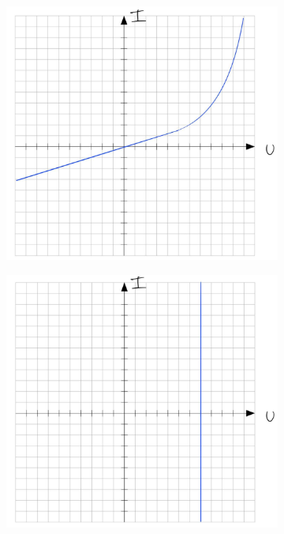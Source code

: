 \begin{figure}[H]
\begin{subfigure}[b]{0.45\textwidth}
        \caption{}
        \label{fig:VA_C_c}
    \end{subfigure}
    \hfill
    \begin{subfigure}[b]{0.45\textwidth}
        \includegraphics[width=\textwidth]{Voraufgaben/Cd.jpg}
        \caption{}
        \label{fig:VA_C_d}
    \end{subfigure}
    \vspace{0.5em}
    \begin{subfigure}[b]{0.45\textwidth}
        \includegraphics[width=\textwidth]{Voraufgaben/Ce.jpg}

\end{subfigure}
\end{figure}
